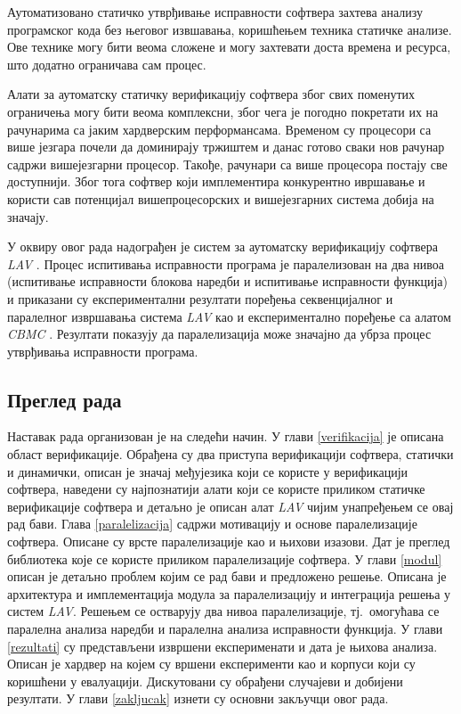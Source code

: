 \documentclass[12pt,oneside]{memoir}
\begin{document}
 Аутоматизовано статичко утврђивање исправности софтвера захтева анализу програмског кода без његовог извшавања, коришћењем техника статичке анализе. Ове технике могу бити веома сложене и могу захтевати доста времена и ресурса, што додатно ограничава сам процес.

 Алати за аутоматску статичку верификацију софтвера због свих поменутих ограничења могу бити веома комплексни, због чега је погодно покретати их на рачунарима са јаким хардверским перформансама. Временом су процесори са више језгара почели да доминирају тржиштем и данас готово сваки нов рачунар садржи вишејезгарни процесор. Такође, рачунари са више процесора постају све доступнији. Због тога софтвер који имплементира конкурентно ивршавање и користи сав потенцијал вишепроцесорских и вишејезгарних система добија на значају.
 
 У оквиру овог рада надограђен је систем за аутоматску верификацију софтвера \textit{LAV} \cite{mvjphd}. Процес испитивања исправности програма је паралелизован на два нивоа (испитивање исправности блокова наредби и испитивање исправности функција) и приказани су експериментални резултати поређења секвенцијалног и паралелног извршавања система \textit{LAV} као и експериментално поређење са алатом \textit{CBMC} \cite{cbmc}. Резултати показују да паралелизација може значајно да убрза процес утврђивања исправности програма.



\subsection{Преглед рада}

Наставак рада организован је на следећи начин. У глави \ref{verifikacija} је описана област верификације. Обрађена су два приступа верификацији софтвера, статички и динамички, описан је значај међујезика који се користе у верификацији софтвера, наведени су најпознатији алати који се користе приликом статичке верификације софтвера и детаљно је описан алат \textit{LAV} чијим унапређењем се овај рад бави. Глава \ref{paralelizacija} садржи мотивацију и основе паралелизације софтвера. Описане су врсте паралелизације као и њихови изазови. Дат је преглед библиотека које се користе приликом паралелизације софтвера. У глави \ref{modul} описан је детаљно проблем којим се рад бави и предложено решење. Описана је архитектура и имплементација модула за паралелизацију и интеграција решења у систем \textit{LAV}. Решењем се остварују два нивоа паралелизације, тј.~омогућава се паралелна анализа наредби и паралелна анализа исправности функција. У глави \ref{rezultati} су представљени извршени експерименати и дата је њихова анализа. Описан је хардвер на којем су вршени експерименти као и корпуси који су коришћени у евалуацији. Дискутовани су обрађени случајеви и добијени резултати. У глави \ref{zakljucak} изнети су основни закључци овог рада.
\end{document}
